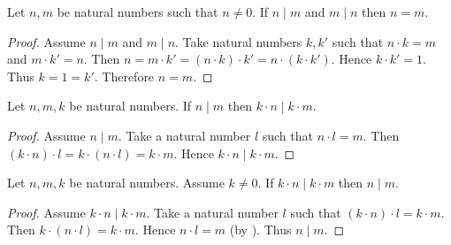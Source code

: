 \documentclass[10pt]{article}
\begin{document}
  \begin{forthel}
    \begin{proposition}
      Let $n, m$ be natural numbers such that $n \neq 0$.
      If $n \mid m$ and $m \mid n$ then $n = m$.
    \end{proposition}
    \begin{proof}
      Assume $n \mid m$ and $m \mid n$.
      Take natural numbers $k,k'$ such that $n \cdot k = m$ and $m \cdot k' = n$.
      Then $n
        = m \cdot k'
        = (n \cdot k) \cdot k'
        = n \cdot (k \cdot k')$.
      Hence $k \cdot k' = 1$.
      Thus $k = 1 = k'$.
      Therefore $n = m$.
    \end{proof}
  \end{forthel}

  \begin{forthel}
    \begin{proposition}
      Let $n, m, k$ be natural numbers.
      If $n \mid m$ then $k \cdot n \mid k \cdot m$.
    \end{proposition}
    \begin{proof}
      Assume $n \mid m$.
      Take a natural number $l$ such that $n \cdot l = m$.
      Then $(k \cdot n) \cdot l
        = k \cdot (n \cdot l)
        = k \cdot m$.
      Hence $k \cdot n \mid k \cdot m$.
    \end{proof}
  \end{forthel}

  \begin{forthel}
    \begin{proposition}
      Let $n, m, k$ be natural numbers.
      Assume $k \neq 0$.
      If $k \cdot n \mid k \cdot m$ then $n \mid m$.
    \end{proposition}
    \begin{proof}
      Assume $k \cdot n \mid k \cdot m$.
      Take a natural number $l$ such that $(k \cdot n) \cdot l = k \cdot m$.
      Then $k \cdot (n \cdot l) = k \cdot m$.
      Hence $n \cdot l = m$ (by ).
      Thus $n \mid m$.
    \end{proof}
  \end{forthel}
\end{document}

